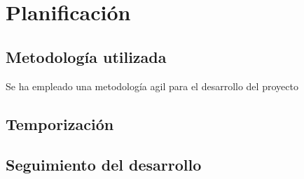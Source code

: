 \chapter{Planificación}

\section{Metodología utilizada}
    Se ha empleado una metodología agil para el desarrollo del proyecto

\section{Temporización}

\section{Seguimiento del desarrollo}
